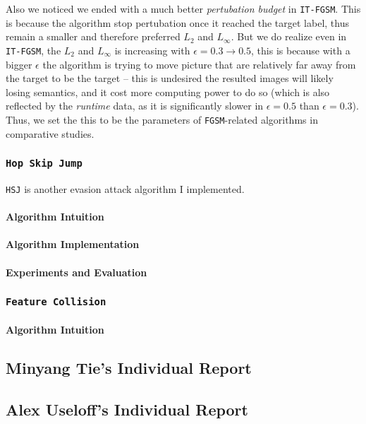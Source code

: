 \documentclass[11pt]{article}
\newcommand{\ilc}{\texttt}
\begin{document}
Also we noticed we ended with a much better \textit{pertubation budget} in \ilc{IT-FGSM}. This is because the algorithm stop pertubation once it reached the target label, thus remain a smaller and therefore preferred $L_2$ and $L_\infty$. But we do realize even in \ilc{IT-FGSM}, the $L_2$ and $L_\infty$ is increasing with $\epsilon = 0.3 \rightarrow 0.5$, this is because with a bigger $\epsilon$ the algorithm is trying to move picture that are relatively far away from the target to be the target -- this is undesired the resulted images will likely losing semantics, and it cost more computing power to do so (which is also reflected by the \textit{runtime} data, as it is significantly slower in $\epsilon = 0.5$ than $\epsilon = 0.3$). Thus, we set the this to be the parameters of \ilc{FGSM}-related algorithms in comparative studies.



\subsubsection{\ilc{Hop Skip Jump}}

\ilc{HSJ}\cite{cite:hsj_paper} is another evasion attack algorithm I implemented.

\paragraph{Algorithm Intuition}
\paragraph{Algorithm Implementation}
\paragraph{Experiments and Evaluation}


\subsubsection{\ilc{Feature Collision}}
\paragraph{Algorithm Intuition}


\subsection{Minyang Tie's Individual Report}


\subsection{Alex Useloff's Individual Report}
\end{document}
